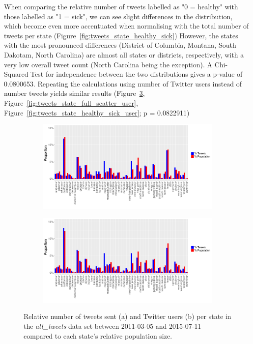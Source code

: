 \documentclass[11pt, a4paper]{article}\usepackage[]{graphicx}\usepackage[]{color}
\begin{document}
When comparing the relative number of tweets labelled as "0 = healthy" with those labelled as "1 = sick", we can see slight differences in the distribution, which become even more accentuated when normalising with the total number of tweets per state (Figure~\ref{fig:tweets_state_healthy_sick}) However, the states with the most pronounced differences (District of Columbia, Montana, South Dakotam, North Carolina) are almost all states or districts, respectively, with a very low overall tweet count (North Carolina being the exception). A Chi-Squared Test for independence between the two distributions gives a p-value of 0.0800653. Repeating the calculations using number of Twitter users instead of number tweets yields similar results (Figure~\ref{fig:tweets_state_full_user}, Figure~\ref{fig:tweets_state_full_scatter_user}, Figure~\ref{fig:tweets_state_healthy_sick_user}; p = 0.0822911)

\begin{figure}[h]
\centering
\begin{subfigure}[t]{1\textwidth}
  \includegraphics[width=1\linewidth]{activity_total_state_Twitter_full_aggregated.png}
  \caption{}
  \label{fig:tweets_state_full}
  \end{subfigure}
  
  \begin{subfigure}[t]{1\textwidth}
  \includegraphics[width=1\linewidth]{activity_total_user_state_Twitter_full_aggregated.png}
  \caption{}
    \label{fig:tweets_state_full_user}
  \end{subfigure}
\caption{Relative number of tweets sent (a) and Twitter users (b) per state in the \textit{all\_tweets} data set between 2011-03-05 and 2015-07-11 compared to each state's relative population size.}
\end{figure}
\end{document}
